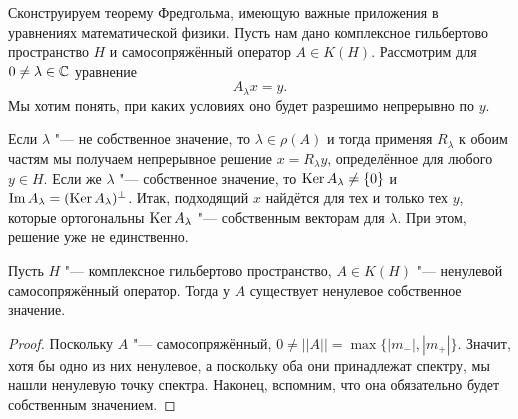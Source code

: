\documentclass[main]{subfiles}
\begin{document}
Сконструируем теорему Фредгольма, имеющую
важные приложения в уравнениях математической физики.
Пусть нам дано комплексное гильбертово пространство
\( H \) и самосопряжённый оператор \( A \in K(H) \).
Рассмотрим для \( 0 \ne \lambda \in \mathbb{C} \) уравнение
\[
  A_\lambda x = y.
\]
Мы хотим понять, при каких условиях оно будет
разрешимо непрерывно по \( y \).

Если \( \lambda \) "--- не собственное значение,
то \( \lambda \in \rho(A) \) и тогда
применяя \( R_\lambda \) к обоим частям мы получаем
непрерывное решение \( x = R_\lambda y \), определённое
для любого \( y \in H \).
Если же \( \lambda \) "--- собственное значение,
то \( \operatorname{Ker} A_\lambda \ne \{ 0 \} \)
и \( \operatorname{Im} A_\lambda = (\operatorname{Ker} A_\lambda)^\perp \).
Итак, подходящий \( x \) найдётся для тех и только тех
\( y \), которые ортогональны \( \operatorname{Ker} A_\lambda \) "---
собственным векторам для \( \lambda \).
При этом, решение уже не единственно.

\begin{lemma}\label{thm:ksco-eigenvalue}
  Пусть \( H \) "--- комплексное гильбертово пространство,
  \( A \in K(H) \) "--- ненулевой самосопряжённый оператор.
  Тогда у \( A \) существует ненулевое собственное значение.
\end{lemma}
\begin{proof}
  Поскольку \( A \) "--- самосопряжённый,
  \( 0 \ne ||A|| = \max \{ |m_-|, |m_+| \} \).
  Значит, хотя бы одно из них ненулевое,
  а поскольку оба они принадлежат спектру,
  мы нашли ненулевую точку спектра. Наконец,
  вспомним, что она обязательно будет
  собственным значением.
\end{proof}
\end{document}
